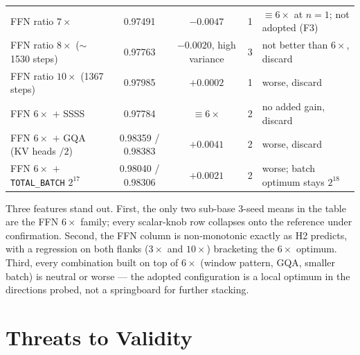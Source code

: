 \documentclass{article}
\begin{document}
\begin{table}[t]
\begin{center}
\begin{small}
\begin{tabular}{lcccl}
FFN ratio $7\times$ & 0.97491 & $-0.0047$ & 1 & $\equiv 6\times$ at $n{=}1$; not adopted (F3) \\
FFN ratio $8\times$ ($\sim$1530 steps) & 0.97763 & $-0.0020$, high variance & 3 & not better than $6\times$, discard \\
FFN ratio $10\times$ (1367 steps) & 0.97985 & $+0.0002$ & 1 & worse, discard \\
FFN $6\times$ $+$ SSSS & 0.97784 & $\equiv 6\times$ & 2 & no added gain, discard \\
FFN $6\times$ $+$ GQA (KV heads $/2$) & 0.98359 / 0.98383 & $+0.0041$ & 2 & worse, discard \\
FFN $6\times$ $+$ \texttt{TOTAL\_BATCH} $2^{17}$ & 0.98040 / 0.98306 & $+0.0021$ & 2 & worse; batch optimum stays $2^{18}$ \\
\bottomrule
\end{tabular}
\end{small}
\end{center}
\vskip -0.1in
\end{table}

Three features stand out. First, the only two sub-base 3-seed means in the table are the FFN $6\times$ family; every scalar-knob row collapses onto the reference under confirmation. Second, the FFN column is non-monotonic exactly as H2 predicts, with a regression on both flanks ($3\times$ and $10\times$) bracketing the $6\times$ optimum. Third, every combination built on top of $6\times$ (window pattern, GQA, smaller batch) is neutral or worse --- the adopted configuration is a local optimum in the directions probed, not a springboard for further stacking.

\section{Threats to Validity}
\label{sec:threats}
\end{document}
